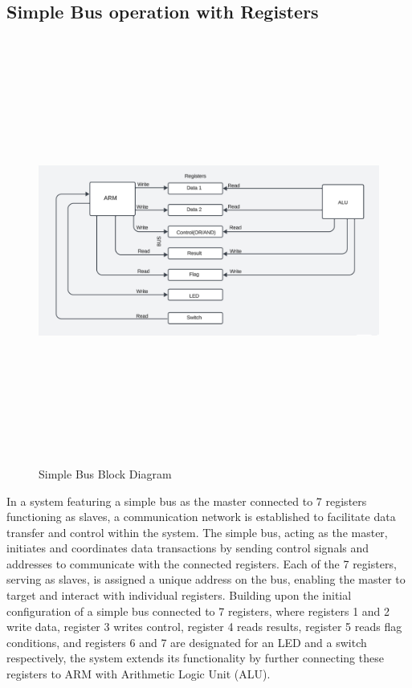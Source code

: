 \documentclass[a4paper,12pt,english]{report}
\begin{document}
\subsection{Simple Bus operation with Registers}
\begin{figure}[h!]
\centering
\includegraphics[width=16cm, height=14cm]{simple_bus.png} %
\caption{Simple Bus Block Diagram}
\end{figure}
\newpage
In a system featuring a simple bus as the master connected to 7 registers functioning as slaves, a communication network is established to facilitate data transfer and control within the system. The simple bus, acting as the master, initiates and coordinates data transactions by sending control signals and addresses to communicate with the connected registers. Each of the 7 registers, serving as slaves, is assigned a unique address on the bus, enabling the master to target and interact with individual registers. Building upon the initial configuration of a simple bus connected to 7 registers, where registers 1 and 2 write data, register 3 writes control, register 4 reads results, register 5 reads flag conditions, and registers 6 and 7 are designated for an LED and a switch respectively, the system extends its functionality by further connecting these registers to ARM with Arithmetic Logic Unit (ALU).
\vspace{2mm}
\end{document}
